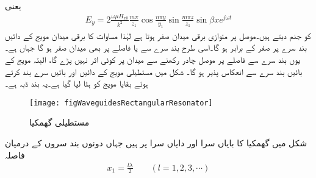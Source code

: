 یعنی
\begin{align}\label{مساوات_مویج_گھمکی_برقی_الف}
E_y=2 \frac{\omega \mu H_{x0}}{k^2}\frac{m \pi}{z_1}\cos \frac{n\pi y}{y_1} \sin \frac{m \pi z}{z_1} \sin \beta x e^{j\omega t}
\end{align}
کو جنم دیتے ہیں۔موصل پر متوازی برقی میدان صفر ہوتا ہے لہٰذا مساوات  کا برقی میدان مویج کے دائیں بند سرے پر صفر کے برابر ہو گا۔اسی طرح بند سرے سے  یا   فاصلے پر بھی میدان صفر ہو گا جہاں  ہے۔ یوں بند سرے سے  فاصلے پر موصل چادر رکھنے سے میدان پر کوئی اثر نہیں پڑے گا، البتہ  مویج کے  بائیں بند سرے سے انعکاس پذیر ہو گا۔ شکل  میں مستطیلی مویج کے دائیں اور بائیں سرے بند کرتے ہوئے بقایا مویج کو ہٹا لیا گیا ہے۔یہ بند ڈبہ  ہے۔  

\begin{figure}
\centering
\texttt{[image: figWaveguidesRectangularResonator]}
\caption{مستطیلی گھمکیا}
\label{شکل_مویج_مستطیل_گھمکیا}
\end{figure}
شکل  میں گھمکیا کا بایاں سرا  اور دایاں سرا  پر ہیں جہاں دونوں بند سروں کے درمیان فاصلہ
\begin{align}\label{مساوات_مویج_گھمکیا_لمبائی_شرط}
x_1=\frac{l \lambda}{2}  \quad \quad (l=1,2,3,\cdots)
\end{align}

